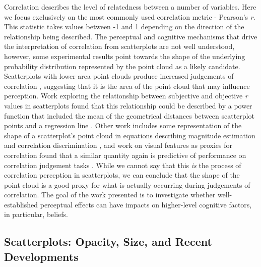 \documentclass[manuscript,screen,review,anonymous]{acmart}
\begin{document}
Correlation describes the level of relatedness between a number of
variables. Here we focus exclusively on the most commonly used
correlation metric - Pearson's \emph{r}. This statistic takes values
between -1 and 1 depending on the direction of the relationship being
described. The perceptual and cognitive mechanisms that drive the
interpretation of correlation from scatterplots are not well understood,
however, some experimental results point towards the shape of the
underlying probability distribution represented by the point cloud as a
likely candidate. Scatterplots with lower area point clouds produce
increased judgements of correlation \citep{cleveland_1982}, suggesting
that it is the area of the point cloud that may influence perception.
Work exploring the relationship between subjective and objective
\emph{r} values in scatterplots found that this relationship could be
described by a power function that included the mean of the geometrical
distances between scatterplot points and a regression line
\citep{meyer_1997}. Other work includes some representation of the shape
of a scatterplot's point cloud in equations describing magnitude
estimation and correlation discrimination
\citep{meyer_1997, rensink_2017}, and work on visual features as proxies
for correlation found that a similar quantity again is predictive of
performance on correlation judgement tasks \citep{yang_2019}. While we
cannot say that this \emph{is} the process of correlation perception in
scatterplots, we can conclude that the shape of the point cloud is a
good proxy for what is actually occurring during judgements of
correlation. The goal of the work presented is to investigate whether
well-established perceptual effects can have impacts on higher-level
cognitive factors, in particular, beliefs.

\subsection{Scatterplots: Opacity, Size, and Recent
Developments}\label{sec-scatterplots}
\end{document}
